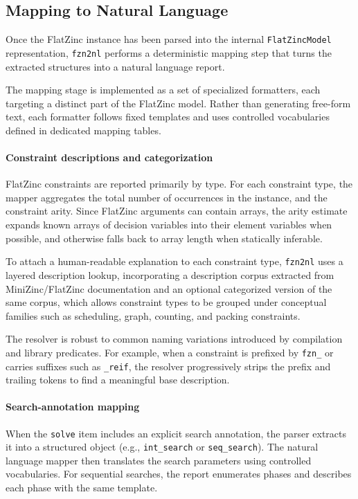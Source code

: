 \documentclass[../../main]{subfiles}
\begin{document}
\subsection{Mapping to Natural Language}

Once the FlatZinc instance has been parsed into the internal \texttt{FlatZincModel} representation, \texttt{fzn2nl} performs a deterministic mapping step that turns the extracted structures into a natural language report.

The mapping stage is implemented as a set of specialized formatters, each targeting a distinct part of the FlatZinc model. Rather than generating free-form text, each formatter follows fixed templates and uses controlled vocabularies defined in dedicated mapping tables.

\paragraph{Constraint descriptions and categorization}
FlatZinc constraints are reported primarily by type. For each constraint type, the mapper aggregates the total number of occurrences in the instance, and the constraint arity. Since FlatZinc arguments can contain arrays, the arity estimate expands known arrays of decision variables into their element variables when possible, and otherwise falls back to array length when statically inferable.

To attach a human-readable explanation to each constraint type, \texttt{fzn2nl} uses a layered description lookup, incorporating a description corpus extracted from MiniZinc/FlatZinc documentation and an optional categorized version of the same corpus, which allows constraint types to be grouped under conceptual families such as scheduling, graph, counting, and packing constraints.

The resolver is robust to common naming variations introduced by compilation and library predicates. For example, when a constraint is prefixed by \texttt{fzn\_} or carries suffixes such as \texttt{\_reif}, the resolver progressively strips the prefix and trailing tokens to find a meaningful base description.

\paragraph{Search-annotation mapping}
When the \texttt{solve} item includes an explicit search annotation, the parser extracts it into a structured object (e.g., \texttt{int\_search} or \texttt{seq\_search}). The natural language mapper then translates the search parameters using controlled vocabularies. For sequential searches, the report enumerates phases and describes each phase with the same template.
\end{document}
